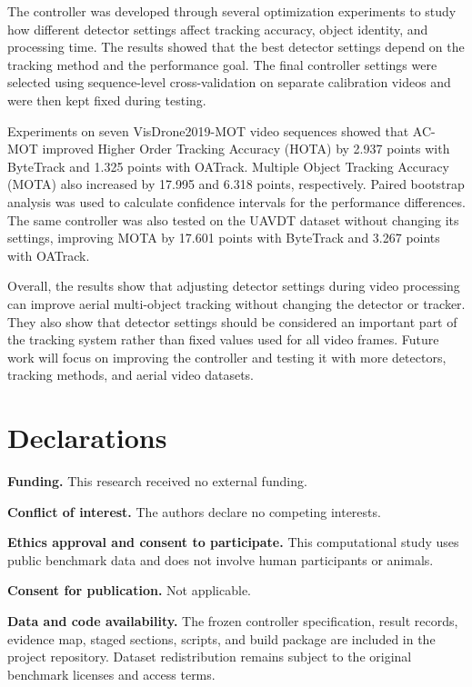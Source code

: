 \documentclass[pdflatex,sn-mathphys-num,iicol]{sn-jnl}
\begin{document}
The controller was developed through several optimization experiments to study
how different detector settings affect tracking accuracy, object identity, and
processing time. The results showed that the best detector settings depend on
the tracking method and the performance goal. The final controller settings
were selected using sequence-level cross-validation on separate calibration
videos and were then kept fixed during testing.

Experiments on seven VisDrone2019-MOT video sequences showed that AC-MOT
improved Higher Order Tracking Accuracy (HOTA) by 2.937 points with ByteTrack
and 1.325 points with OATrack. Multiple Object Tracking Accuracy (MOTA) also
increased by 17.995 and 6.318 points, respectively. Paired bootstrap analysis
was used to calculate confidence intervals for the performance differences.
The same controller was also tested on the UAVDT dataset without changing its
settings, improving MOTA by 17.601 points with ByteTrack and 3.267 points with
OATrack.

Overall, the results show that adjusting detector settings during video
processing can improve aerial multi-object tracking without changing the
detector or tracker. They also show that detector settings should be
considered an important part of the tracking system rather than fixed values
used for all video frames. Future work will focus on improving the controller
and testing it with more detectors, tracking methods, and aerial video
datasets.

\backmatter

\section*{Declarations}

\noindent\textbf{Funding.} This research received no external funding.

\noindent\textbf{Conflict of interest.} The authors declare no competing interests.

\noindent\textbf{Ethics approval and consent to participate.} This computational study uses public benchmark data and does not involve human participants or animals.

\noindent\textbf{Consent for publication.} Not applicable.

\noindent\textbf{Data and code availability.} The frozen controller specification, result records, evidence map, staged sections, scripts, and build package are included in the project repository. Dataset redistribution remains subject to the original benchmark licenses and access terms.
\end{document}
